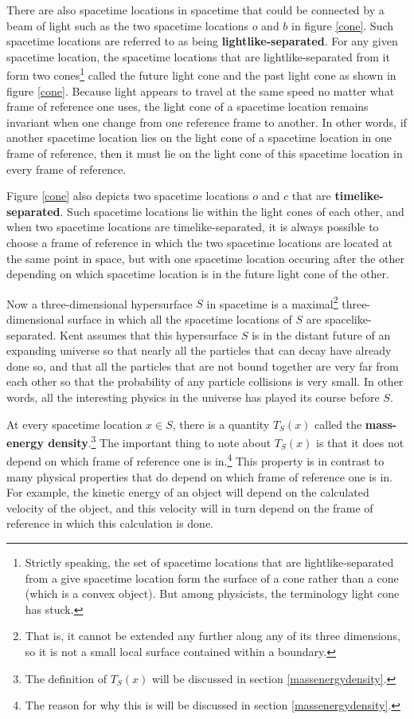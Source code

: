 There are also spacetime locations in spacetime that could be connected by a beam of light such as the two spacetime locations $o$ and $b$ in figure \ref{cone}. Such spacetime locations are referred to as being \textbf{lightlike-separated}. For any given spacetime location, the spacetime locations that are lightlike-separated from it form two cones\footnote{Strictly speaking, the set of spacetime locations that are lightlike-separated from a give spacetime location form the surface of a cone rather than a cone (which is a convex object). But among physicists, the terminology light cone has stuck.} called the future light cone and the past light cone as shown in figure \ref{cone}. Because light appears to travel at the same speed no matter what frame of reference one uses, the light cone of a spacetime location remains invariant when one change from one reference frame to another. In other words, if another spacetime location lies on the light cone of a spacetime location in one frame of reference, then it must lie on the light cone of this spacetime location in every frame of reference. 

Figure \ref{cone} also depicts two spacetime locations $o$ and $c$ that are \textbf{timelike-separated}. Such spacetime locations lie within the light cones of each other, and when two spacetime locations are timelike-separated, it is always possible to choose a frame of reference in which the two spacetime locations are located at the same point in space, but with one spacetime location occuring after the other  depending on which spacetime location is in  the future light cone of the other. 

Now a three-dimensional hypersurface $S$ in spacetime is a maximal\footnote{That is, it cannot be extended any further along any of its three dimensions, so it is not a small local surface contained within a boundary.} three-dimensional surface in which all the spacetime locations of $S$ are spacelike-separated. Kent assumes that this hypersurface $S$ is in the distant future of an expanding universe so that nearly all the particles that can decay have already done so, and that all the particles that are not bound together are very far from each other so that the probability of any particle collisions is very small. In other words, all the interesting physics in the universe has played its course before $S$.

At every spacetime location $x\in S$, there is a quantity $T_S(x)$ called the \label{massenergydensity}\textbf{mass-energy density}.\footnote{The definition of $T_S(x)$ will be discussed in section \ref{massenergydensity}.} The important thing to note about $T_S(x)$ is that it does not depend on which frame of reference one is in.\footnote{The reason for why this is will be discussed in section \ref{massenergydensity}.}
  This property is in contrast to many physical properties that do depend on which frame of reference one is in. For example, the kinetic energy of an object will depend on the calculated velocity of the object, and this velocity will in turn depend on the frame of reference in which this calculation is done. 
  
